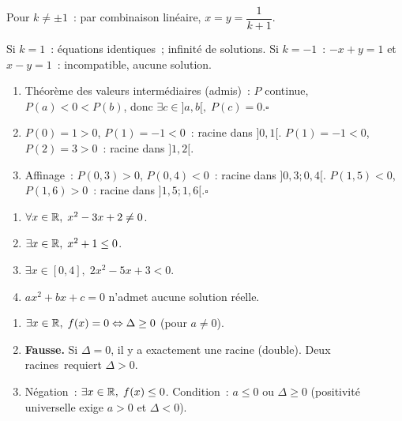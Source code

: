 Pour $k\ne\pm1$~: par combinaison lin\'eaire, $x=y=\dfrac{1}{k+1}$.

Si $k=1$~: \'equations identiques~; infinit\'e de solutions.
Si $k=-1$~: $-x+y=1$ et $x-y=1$~: incompatible, aucune solution.


\begin{enumerate}
  \item Th\'eor\`eme des valeurs interm\'ediaires (admis)~: $P$ continue,
        $P(a)<0<P(b)$, donc $\exists c\in]a,b[,\;P(c)=0$.\hfill$\square$
  \item $P(0)=1>0$, $P(1)=-1<0$~: racine dans $]0,1[$.\checkmark\quad
        $P(1)=-1<0$, $P(2)=3>0$~: racine dans $]1,2[$.\checkmark
  \item Affinage~: $P(0{,}3)>0$, $P(0{,}4)<0$~: racine dans $]0{,}3;0{,}4[$.
        $P(1{,}5)<0$, $P(1{,}6)>0$~: racine dans $]1{,}5;1{,}6[$.\hfill$\square$
\end{enumerate}


\begin{enumerate}
  \item $\forall x\in\mathbb{R},\;x^2-3x+2\ne0$.
  \item $\exists x\in\mathbb{R},\;x^2+1\leq0$.
  \item $\exists x\in[0,4],\;2x^2-5x+3<0$.
  \item \og $ax^2+bx+c=0$ n'admet aucune solution r\'eelle.\fg
\end{enumerate}


\begin{enumerate}
  \item $\exists x\in\mathbb{R},\;f(x)=0\Leftrightarrow\Delta\geq0$ (pour $a\ne0$).
  \item \textbf{Fausse.} Si $\Delta=0$, il y a exactement une racine (double).
        \og Deux racines\fg\ requiert $\Delta>0$.
  \item N\'egation~: $\exists x\in\mathbb{R},\;f(x)\leq0$.
        Condition~: $a\leq0$ ou $\Delta\geq0$
        (positivit\'e universelle exige $a>0$ et $\Delta<0$).
\end{enumerate}

